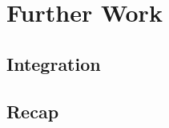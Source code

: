 \chapter{Further Work}\label{ch:further}

\section{Integration}\label{sc:further:integration}

\section{Recap}\label{sc:further:recap}
